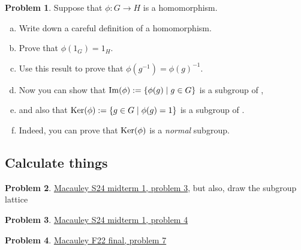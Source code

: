 \documentclass[12pt]{article}
\theoremstyle{definition} %
\newtheorem{problem}{Problem}
\newcommand\inv{^{-1}} %
\begin{document}
\begin{problem}
    Suppose that $\phi:G\to H$ is a homomorphism.
    \begin{enumerate}[(a)]
        \item Write down a careful definition of a homomorphism.
        \item Prove that $\phi(1_G) = 1_H$.
        \item Use this result to prove that $\phi(g\inv) = \phi(g)\inv$.
        \item Now you can show that $\operatorname{Im}(\phi) := \{\phi(g) \mid g\in G\}$ is a subgroup of \underline{\quad},
        \item and also that $\operatorname{Ker}(\phi) := \{g \in G \mid \phi(g) = 1\}$ is a subgroup of \underline{\quad}.
        \item Indeed, you can prove that $\operatorname{Ker}(\phi)$ is a \textit{normal} subgroup.
    \end{enumerate}
\end{problem}

\subsection*{Calculate things}

\begin{problem}
    \href{https://www.math.clemson.edu/~macaule/classes/s24_math4120/exams/s24_math4120_midterm1.pdf}{Macauley S24 midterm 1, problem 3}, but also, draw the subgroup lattice
\end{problem}

\begin{problem}
    \href{https://www.math.clemson.edu/~macaule/classes/s24_math4120/exams/s24_math4120_midterm1.pdf}{Macauley S24 midterm 1, problem 4}
\end{problem}

\begin{problem}
    \href{https://www.math.clemson.edu/~macaule/classes/f22_math4120/exams/f22_math4120_finalexam.pdf}{Macauley F22 final, problem 7}
\end{problem}
\end{document}
